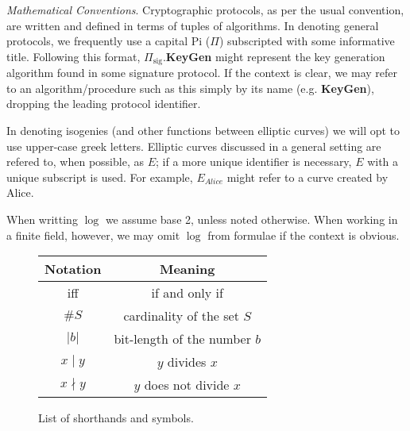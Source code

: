 \vspace{15px}

\noindent
\textit{Mathematical Conventions}. Cryptographic protocols, as per the usual convention, are written and defined in terms of tuples of algorithms. In denoting general protocols, we frequently use a capital Pi ($\Pi$) subscripted with some informative title. Following this format, $\Pi_{\text{sig}}$.\textbf{KeyGen} might represent the key generation algorithm found in some signature protocol. If the context is clear, we may refer to an algorithm/procedure such as this simply by its name (e.g. \textbf{KeyGen}), dropping the leading protocol identifier.

In denoting isogenies (and other functions between elliptic curves) we will opt to use upper-case greek letters. Elliptic curves discussed in a general setting are refered to, when possible, as $E$; if a more unique identifier is necessary, $E$ with a unique subscript is used. For example, $E_{Alice}$ might refer to a curve created by Alice.  

When writting $\log$ we assume base 2, unless noted otherwise. When working in a finite field, however, we may omit $\log$ from formulae if the context is obvious.

\begin{figure}
\begin{center}
\begin{tabular}{ c | c }
\hline
Notation & Meaning\\
\hline
iff & if and only if\\
$\#S$ & cardinality of the set $S$\\
$\vert b \vert$ & bit-length of the number $b$\\
$x \mid y$ & $y$ divides $x$\\
$x \nmid y$ & $y$ does not divide $x$\\
\hline
\end{tabular}
\end{center}
\caption{List of shorthands and symbols.}
\label{fig:symbols}
\end{figure}






